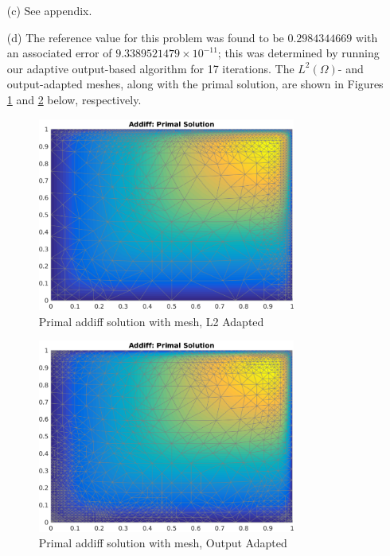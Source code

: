 \documentclass{article}
\begin{document}
\begin{itemize}
	\item[(c)] See appendix.

	\item[(d)] 
	The reference value for this problem was found to be \(0.2984344669\) with an associated error of \(9.3389521479\times 10^{-11} \); this was determined by running our adaptive output-based algorithm for 17 iterations. The \(L^2(\Omega) \)- and output-adapted meshes, along with the primal solution, are shown in Figures \ref{fig:L2_primal} and \ref{fig:out_primal} below, respectively.
	\begin{figure}[H]
		\centering
		\includegraphics[width=0.8\textwidth]{addiff_primal_L2.pdf}
		\caption{Primal addiff solution with mesh, L2 Adapted}
		\label{fig:L2_primal}
	\end{figure}
	\begin{figure}[H]
		\centering
		\includegraphics[width=0.8\textwidth]{addiff_primal.pdf}
		\caption{Primal addiff solution with mesh, Output Adapted}
		\label{fig:out_primal}
	\end{figure}
	

\end{itemize}
\end{document}
